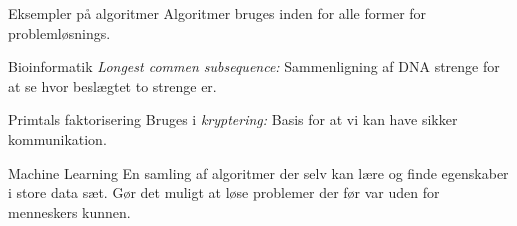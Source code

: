 \documentclass[12pt,t]{beamer}
\begin{document}
    \begin{frame}[t]{Eksempler på algoritmer}
        Algoritmer bruges inden for alle former for problemløsnings. \pause{}
        \begin{block}{Bioinformatik}
            \emph{Longest commen subsequence: } Sammenligning af DNA strenge
            for at se hvor beslægtet to strenge er. \pause{}
        \end{block}
        \begin{block}{Primtals faktorisering}
            Bruges i \emph{kryptering: } Basis for at vi kan have sikker
            kommunikation. \pause{}
        \end{block}

        \begin{block}{Machine Learning}
            En samling af algoritmer der selv kan lære og finde egenskaber
            i store data sæt. Gør det muligt at løse problemer der før var
            uden for menneskers kunnen.
        \end{block}
    \end{frame}
\end{document}
